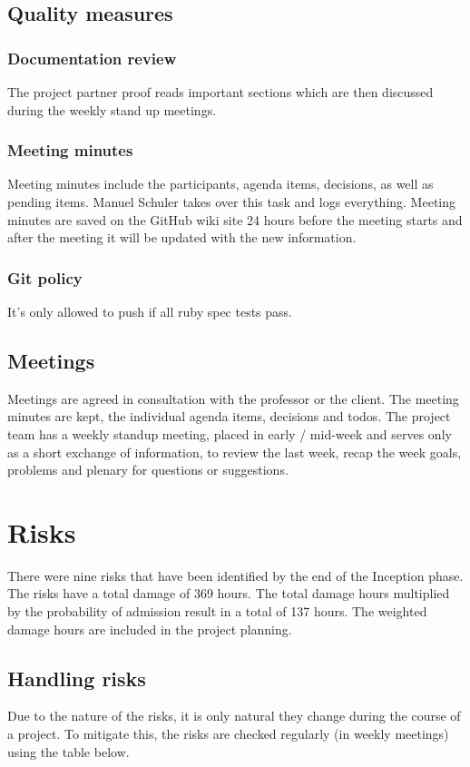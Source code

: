 \subsection{Quality measures}

\subsubsection{Documentation review}
The project partner proof reads important sections which are then discussed
during the weekly stand up meetings.


\subsubsection{Meeting minutes}
Meeting minutes include the participants, agenda items, decisions, as well as
pending items. Manuel Schuler takes over this task and logs everything.
Meeting minutes are saved on the GitHub wiki site 24 hours before the meeting
starts and after the meeting it will be updated with the new information.

\subsubsection{Git policy}
It's only allowed to push if all ruby spec tests pass.


\subsection{Meetings}
Meetings are agreed in consultation with the professor or the client.
The meeting minutes are kept, the individual agenda items, decisions and todos.
The project team has a weekly standup meeting, placed in early / mid-week and
serves only as a short exchange of information, to review the last week, recap
the week goals, problems and plenary for questions or suggestions.


\section{Risks}
There were nine risks that have been identified by the end of the Inception phase.
The risks have a total damage of 369 hours. The total damage hours multiplied
by the probability of admission result in a total of 137 hours. The weighted damage
hours are included in the project planning.

\subsection{Handling risks}
Due to the nature of the risks, it is only natural they change during the course of a project.
To mitigate this, the risks are checked regularly (in weekly meetings) using the table below.

